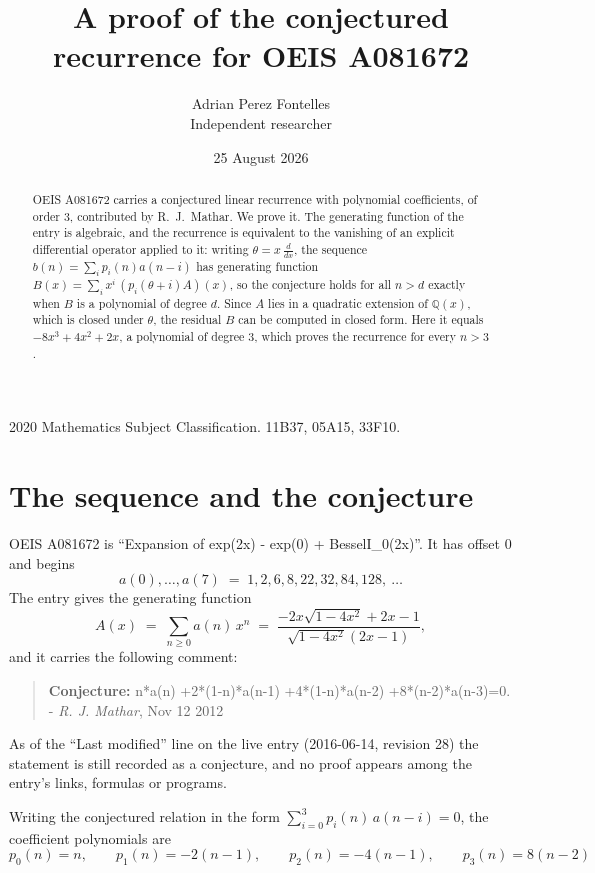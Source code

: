 \documentclass[11pt,a4paper]{article}
\title{A proof of the conjectured recurrence for OEIS A081672}
\author{Adrian Perez Fontelles\\ \small Independent researcher}
\date{25 August 2026}
\theoremstyle{plain}
\theoremstyle{definition}
\begin{document}
\maketitle

\begin{abstract}
OEIS A081672 carries a conjectured linear recurrence with polynomial coefficients, of
order 3, contributed by R.~J.~Mathar. We prove it. The generating function of the
entry is algebraic, and the recurrence is equivalent to the vanishing of an explicit
differential operator applied to it: writing $\theta=x\,\frac{d}{dx}$, the sequence
$b(n)=\sum_{i}p_{i}(n)a(n-i)$ has generating function
$B(x)=\sum_{i}x^{i}\,(p_{i}(\theta+i)A)(x)$, so the conjecture holds for all $n>d$ exactly
when $B$ is a polynomial of degree $d$. Since $A$ lies in a quadratic extension of
$\mathbb{Q}(x)$, which is closed under $\theta$, the residual $B$ can be computed in
closed form. Here it equals $- 8 x^{3} + 4 x^{2} + 2 x$, a polynomial of degree $3$, which proves
the recurrence for every $n>3$.
\end{abstract}

\noindent\small 2020 Mathematics Subject Classification. 11B37, 05A15, 33F10.\normalsize

\section{The sequence and the conjecture}

OEIS A081672 is ``Expansion of exp(2x) - exp(0) + BesselI\_0(2x)''. It has offset $0$ and begins
\[
a(0),\dots,a(7)\;=\;1, 2, 6, 8, 22, 32, 84, 128,\ \dots
\]
The entry gives the generating function
\begin{equation}\label{eq:gf}
A(x)\;=\;\sum_{n\ge 0} a(n)\,x^{n}\;=\;\frac{- 2 x \sqrt{1 - 4 x^{2}} + 2 x - 1}{\sqrt{1 - 4 x^{2}} \left(2 x - 1\right)} ,
\end{equation}
and it carries the following comment:
\begin{quote}\small
\textbf{Conjecture:} n*a(n) +2*(1-n)*a(n-1) +4*(1-n)*a(n-2) +8*(n-2)*a(n-3)=0. - \emph{R. J. Mathar}, Nov 12 2012
\end{quote}
As of the ``Last modified'' line on the live entry (2016-06-14, revision 28) the
statement is still recorded as a conjecture, and no proof appears among the entry's links,
formulas or programs.

Writing the conjectured relation in the form $\sum_{i=0}^{3}p_{i}(n)\,a(n-i)=0$,
the coefficient polynomials are
\[
p_{0}(n)=n,\qquad p_{1}(n)=- 2 \left(n - 1\right),\qquad p_{2}(n)=- 4 \left(n - 1\right),\qquad p_{3}(n)=8 \left(n - 2\right)
\]
\end{document}
